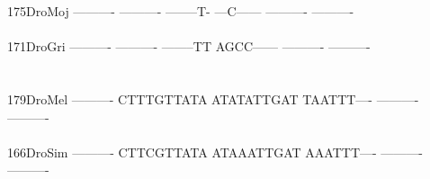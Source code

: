 \documentclass[11pt,twoside,reqno,a4paper]{article}
\begin{document}
{175\hspace*{2\charwidth}DroMoj	----------	----------	--------T-	---C------	----------	----------	\\
\hspace*{5\charwidth}\hspace*{7\charwidth}\hspace*{1\charwidth}\hspace*{1\charwidth}\hspace*{1\charwidth}\hspace*{1\charwidth}\hspace*{1\charwidth}\hspace*{1\charwidth}\\
171\hspace*{2\charwidth}DroGri	----------	----------	--------TT	AGCC------	----------	----------	\\
\hspace*{5\charwidth}\hspace*{7\charwidth}\hspace*{1\charwidth}\hspace*{1\charwidth}\hspace*{1\charwidth}\hspace*{1\charwidth}\hspace*{1\charwidth}\hspace*{1\charwidth}\\
\\
179\hspace*{2\charwidth}DroMel	----------	CTTTGTTATA	ATATATTGAT	TAATTT----	----------	----------	\\
\hspace*{5\charwidth}\hspace*{7\charwidth}\hspace*{1\charwidth}\hspace*{1\charwidth}\hspace*{1\charwidth}\hspace*{1\charwidth}\hspace*{1\charwidth}\hspace*{1\charwidth}\\
166\hspace*{2\charwidth}DroSim	----------	CTTCGTTATA	ATAAATTGAT	AAATTT----	----------	----------	\\
\hspace*{5\charwidth}\hspace*{7\charwidth}\hspace*{1\charwidth}\hspace*{1\charwidth}\hspace*{1\charwidth}\hspace*{1\charwidth}\hspace*{1\charwidth}\hspace*{1\charwidth}\\
}
\end{document}
